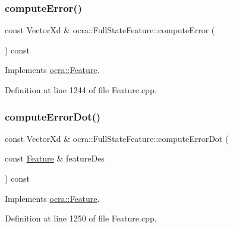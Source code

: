 \subsubsection{\texorpdfstring{compute\+Error()}{computeError()}\hspace{0.1cm}{\footnotesize\ttfamily [2/2]}}
{\footnotesize\ttfamily const Vector\+Xd \& ocra\+::\+Full\+State\+Feature\+::compute\+Error (\begin{DoxyParamCaption}{ }\end{DoxyParamCaption}) const\hspace{0.3cm}{\ttfamily [virtual]}}



Implements \hyperlink{classocra_1_1Feature_a88f87b496aedc7bf9f13b19bb8f9c7fa}{ocra\+::\+Feature}.



Definition at line 1244 of file Feature.\+cpp.

\hypertarget{classocra_1_1FullStateFeature_a0d3e5b76bdcae8e06df07c7f525ad690}{}\label{classocra_1_1FullStateFeature_a0d3e5b76bdcae8e06df07c7f525ad690} 
\subsubsection{\texorpdfstring{compute\+Error\+Dot()}{computeErrorDot()}\hspace{0.1cm}{\footnotesize\ttfamily [1/2]}}
{\footnotesize\ttfamily const Vector\+Xd \& ocra\+::\+Full\+State\+Feature\+::compute\+Error\+Dot (\begin{DoxyParamCaption}\item[{const \hyperlink{classocra_1_1Feature}{Feature} \&}]{feature\+Des }\end{DoxyParamCaption}) const\hspace{0.3cm}{\ttfamily [virtual]}}



Implements \hyperlink{classocra_1_1Feature_ac714181e1bb25f878349e299c4ba8c00}{ocra\+::\+Feature}.



Definition at line 1250 of file Feature.\+cpp.

\hypertarget{classocra_1_1FullStateFeature_af5d860acbb9dc600a432fcba952f95a7}{}\label{classocra_1_1FullStateFeature_af5d860acbb9dc600a432fcba952f95a7} 
